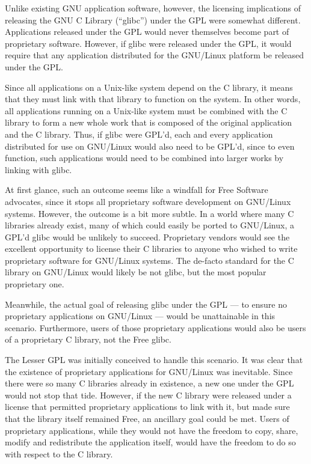 Unlike existing GNU application software, however, the licensing
implications of releasing the GNU C Library (``glibc'') under the GPL were
somewhat different. Applications released under the GPL would never
themselves become part of proprietary software. However, if glibc were
released under the GPL, it would require that any application distributed for
the GNU/Linux platform be released under the GPL\@.

Since all applications on a Unix-like system depend on the C library, it
means that they must link with that library to function on the system. In
other words, all applications running on a Unix-like system must be
combined with the C library to form a new whole work that is
composed of the original application and the C library. Thus, if glibc
were GPL'd, each and every application distributed for use on GNU/Linux
would also need to be GPL'd, since to even function, such applications
would need to be combined into larger works by linking with
glibc.

At first glance, such an outcome seems like a windfall for Free Software
advocates, since it stops all proprietary software development on
GNU/Linux systems. However, the outcome is a bit more subtle. In a world
where many C libraries already exist, many of which could easily be ported
to GNU/Linux, a GPL'd glibc would be unlikely to succeed. Proprietary
vendors would see the excellent opportunity to license their C libraries
to anyone who wished to write proprietary software for GNU/Linux systems.
The de-facto standard for the C library on GNU/Linux would likely be not
glibc, but the most popular proprietary one.

Meanwhile, the actual goal of releasing glibc under the GPL --- to ensure no
proprietary applications on GNU/Linux --- would be unattainable in this
scenario. Furthermore, users of those proprietary applications would also
be users of a proprietary C library, not the Free glibc.

The Lesser GPL was initially conceived to handle this scenario. It was
clear that the existence of proprietary applications for GNU/Linux was
inevitable. Since there were so many C libraries already in existence, a
new one under the GPL would not stop that tide. However, if the new C library
were released under a license that permitted proprietary applications
to link with it, but made sure that the library itself remained Free,
an ancillary goal could be met. Users of proprietary applications, while
they would not have the freedom to copy, share, modify and redistribute
the application itself, would have the freedom to do so with respect to
the C library.

